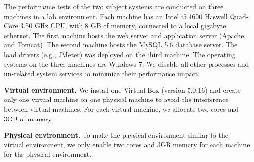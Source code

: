 The performance tests of the two subject systems are conducted on three machines in a lab environment. Each machine has an Intel i5 4690 Haswell Quad-Core 3.50 GHz CPU, with 8 GB of memory, connected to a local gigabyte ethernet. The first machine hosts the web server and application server (Apache and Tomcat). The second machine hosts the MySQL 5.6 database server. The load drivers (e.g., JMeter) was deployed on the third machine. The operating systems on the three machines are Windows 7. We disable all other processes and un-related system services to minimize their performance impact.

\noindent \textbf{Virtual environment.} We install one Virtual Box (version 5.0.16) and create only one virtual machine on one physical machine to avoid the interference between virtual machines. For each virtual machine, we allocate two cores and 3GB of memory. 


\noindent \textbf{Physical environment.} To make the physical environment similar to the virtual environment, we only enable two cores and 3GB memory for each machine for the physical environment. 


